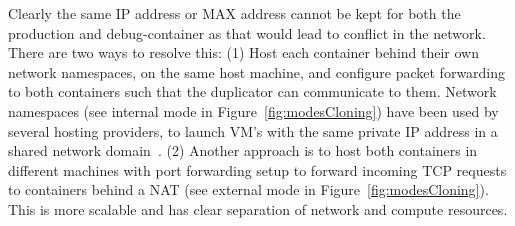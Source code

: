 

\iffalse
Clearly the same IP address or MAX address cannot be kept for both the production and debug-container as that would lead to conflict in the network. 
There are two ways to resolve this: 
(1) Host each container behind their own network namespaces, on the same host machine, and configure packet forwarding to both containers such that the duplicator can communicate to them. 
Network namespaces (see internal mode in Figure~\ref{fig:modesCloning}) 
have been used by several hosting providers, to launch VM's with the 
same private IP address in a shared network domain~\cite{OpenStack}. 
(2) Another approach is to host both containers in different machines with port forwarding setup to forward incoming TCP requests to containers behind a NAT (see external mode in Figure~\ref{fig:modesCloning}). 
This is more scalable and has clear separation of network and compute resources. 


